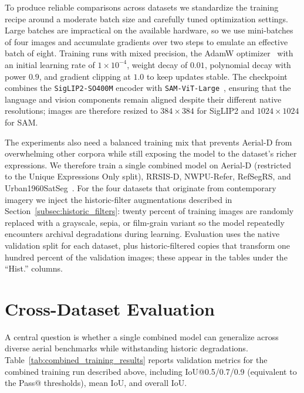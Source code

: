 To produce reliable comparisons across datasets we standardize the training recipe around a moderate batch size and carefully tuned optimization settings. Large batches are impractical on the available hardware, so we use mini-batches of four images and accumulate gradients over two steps to emulate an effective batch of eight. Training runs with mixed precision, the AdamW optimizer~\cite{adamw} with an initial learning rate of $1\times 10^{-4}$, weight decay of $0.01$, polynomial decay with power $0.9$, and gradient clipping at $1.0$ to keep updates stable. The checkpoint combines the \texttt{SigLIP2-SO400M} encoder with \texttt{SAM-ViT-Large}~\cite{siglip2,sam}, ensuring that the language and vision components remain aligned despite their different native resolutions; images are therefore resized to $384\times384$ for SigLIP2 and $1024\times1024$ for SAM.

The experiments also need a balanced training mix that prevents Aerial-D from overwhelming other corpora while still exposing the model to the dataset's richer expressions. We therefore train a single combined model on Aerial-D (restricted to the Unique Expressions Only split), RRSIS-D, NWPU-Refer, RefSegRS, and Urban1960SatSeg~\cite{yuan2023rrsis,yang2024large,hao2025urban1960satseg}. For the four datasets that originate from contemporary imagery we inject the historic-filter augmentations described in Section~\ref{subsec:historic_filters}: twenty percent of training images are randomly replaced with a grayscale, sepia, or film-grain variant so the model repeatedly encounters archival degradations during learning. Evaluation uses the native validation split for each dataset, plus historic-filtered copies that transform one hundred percent of the validation images; these appear in the tables under the ``Hist.'' columns.

\section{Cross-Dataset Evaluation}

A central question is whether a single combined model can generalize across diverse aerial benchmarks while withstanding historic degradations. Table~\ref{tab:combined_training_results} reports validation metrics for the combined training run described above, including IoU@0.5/0.7/0.9 (equivalent to the Pass@ thresholds), mean IoU, and overall IoU.

